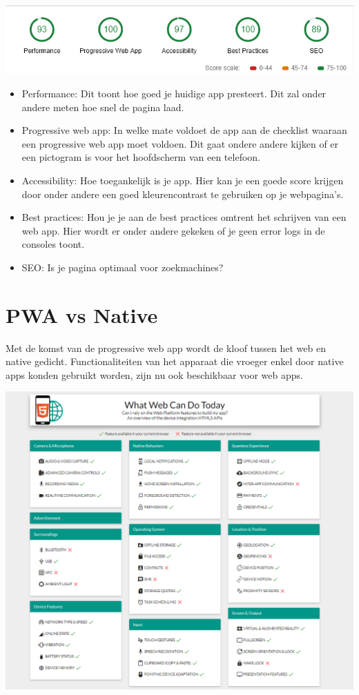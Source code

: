 	\includegraphics[scale=1]{img/audit.png}


\begin{itemize}  
	\item Performance: Dit toont hoe goed je huidige app presteert. Dit zal onder andere meten hoe snel de pagina laad.
	\item Progressive web app: In welke mate voldoet de app aan de checklist waaraan een progressive web app moet voldoen. Dit gaat ondere andere kijken of er een pictogram is voor het hoofdscherm van een telefoon.
	\item Accessibility: Hoe toegankelijk is je app. Hier kan je een goede score krijgen door onder andere een goed kleurencontrast te gebruiken op je webpagina's.
	\item Best practices: Hou je je aan de best practices omtrent het schrijven van een web app. Hier wordt er onder andere gekeken of je geen error logs in de consoles toont.
	\item SEO: Is je pagina optimaal voor zoekmachines?
\end{itemize}


\section{PWA vs Native}
Met de komst van de progressive web app wordt de kloof tussen het web en native gedicht. Functionaliteiten van het apparaat die vroeger enkel door native apps konden gebruikt worden, zijn nu ook beschikbaar voor web apps. 

	\includegraphics[scale=0.6]{img/webToday.png}
	
